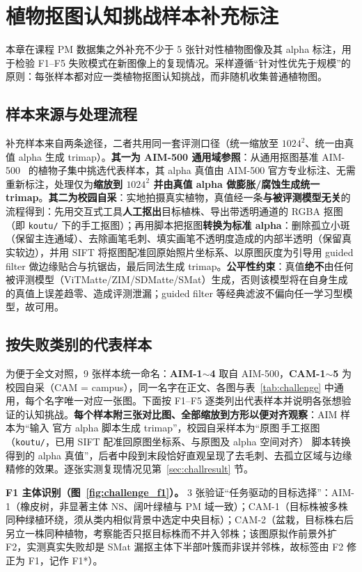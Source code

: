 \documentclass[supercite]{HustGraduPaper}
\begin{document}
	\section{植物抠图认知挑战样本补充标注}\label{sec:challenge}
	本章在课程 PM 数据集之外补充不少于 5 张针对性植物图像及其 alpha 标注，用于检验 F1--F5 失败模式在新图像上的复现情况。采样遵循“针对性优先于规模”的原则：每张样本都对应一类植物抠图认知挑战，而非随机收集普通植物图。

	\subsection{样本来源与处理流程}
	补充样本来自两条途径，二者共用同一套评测口径（统一缩放至 $1024^2$、统一由真值 alpha 生成 trimap）。\textbf{其一为 AIM-500 通用域参照}：从通用抠图基准 AIM-500~\cite{AIM} 的植物子集中挑选代表样本，其 alpha 真值由 AIM-500 官方专业标注、无需重新标注，处理仅为\textbf{缩放到 $1024^2$ 并由真值 alpha 做膨胀/腐蚀生成统一 trimap}。\textbf{其二为校园自采}：实地拍摄真实植物，真值经一条\textbf{与被评测模型无关}的流程得到：先用交互式工具\textbf{人工抠出}目标植株、导出带透明通道的 RGBA 抠图（即 \texttt{koutu/} 下的手工抠图）；再用脚本把抠图\textbf{转换为标准 alpha}：删除孤立小斑（保留主连通域）、去除画笔毛刺、填实画笔不透明度造成的内部半透明（保留真实软边），并用 SIFT 将抠图配准回原始照片坐标系、以原图灰度为引导用 guided filter 做边缘贴合与抗锯齿，最后同法生成 trimap。\textbf{公平性约束}：真值\textbf{绝不}由任何被评测模型（ViTMatte/ZIM/SDMatte/SMat）生成，否则该模型将在自身生成的真值上误差趋零、造成评测泄漏；guided filter 等经典滤波不偏向任一学习型模型，故可用。

	\subsection{按失败类别的代表样本}
	为便于全文对照，9 张样本统一命名：\textbf{AIM-1$\sim$4} 取自 AIM-500，\textbf{CAM-1$\sim$5} 为校园自采（CAM = campus），同一名字在正文、各图与表~\ref{tab:challenge} 中通用，每个名字唯一对应一张图。下面按 F1--F5 逐类列出代表样本并说明各张想验证的认知挑战。\textbf{每个样本附三张对比图、全部缩放到方形以便对齐观察}：AIM 样本为“输入\,\,官方 alpha\,\,脚本生成 trimap”，校园自采样本为“原图\，\,手工抠图（\texttt{koutu/}，已用 SIFT 配准回原图坐标系、与原图及 alpha 空间对齐）\,\,脚本转换得到的 alpha 真值”，后者中段到末段恰好直观呈现了去毛刺、去孤立区域与边缘精修的效果。逐张实测复现情况见第~\ref{sec:challresult} 节。

	\textbf{F1 主体识别（图~\ref{fig:challenge_f1}）。} 3 张验证“任务驱动的目标选择”：AIM-1（橡皮树，非显著主体 NS、阔叶绿植与 PM 域一致）；CAM-1（目标株被多株同种绿植环绕，须从类内相似背景中选定中央目标）；CAM-2（盆栽，目标株右后另立一株同种植物，考察能否只抠目标株而不并入邻株；该图原拟作前景外扩 F2，实测真实失败却是 SMat 漏抠主体下半部叶簇而非误并邻株，故标签由 F2 修正为 F1，记作 F1*）。
\end{document}
